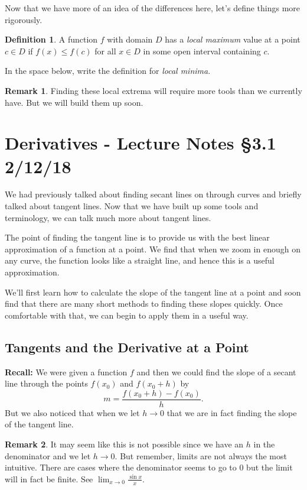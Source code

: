\documentclass[leqno]{article}
\theoremstyle{definition}
\newtheorem{definition}{Definition}[section]
\newtheorem{remark}{Remark}[section]
\theoremstyle{remark}
\theoremstyle{theorem}
\begin{document}
Now that we have more of an idea of the differences here, let's define things more rigorously.

\begin{definition}
A function $f$ with domain $D$ has a \emph{local maximum} value at a point $c\in D$ if $f(x)\leq f(c)$ for all $x\in D$ in some open interval containing $c$.

In the space below, write the definition for \emph{local minima}.
\vspace*{3cm}
\end{definition}

\begin{remark}
Finding these local extrema will require more tools than we currently have. But we will build them up soon.
\end{remark}

\section{Derivatives - Lecture Notes \S 3.1 2/12/18}

We had previously talked about finding secant lines on through curves and briefly talked about tangent lines.  Now that we have built up some tools and terminology, we can talk much more about tangent lines.  

The point of finding the tangent line is to provide us with the best linear approximation of a function at a point.  We find that when we zoom in enough on any curve, the function looks like a straight line, and hence this is a useful approximation.  

We'll first learn how to calculate the slope of the tangent line at a point and soon find that there are many short methods to finding these slopes quickly.  Once comfortable with that, we can begin to apply them in a useful way.

\subsection{Tangents and the Derivative at a Point}

\textbf{Recall:} We were given a function $f$ and then we could find the slope of a secant line through the points $f(x_0)$ and $f(x_0+h)$ by 
\[
m=\frac{f(x_0+h)-f(x_0)}{h}.
\]
But we also noticed that when we let $h\to 0$ that we are in fact finding the slope of the tangent line.  

\begin{remark}
It may seem like this is not possible since we have an $h$ in the denominator and we let $h\to 0$.  But remember, limits are not always the most intuitive.  There are cases where the denominator seems to go to $0$ but the limit will in fact be finite.  See $\lim_{x\to 0} \frac{\sin x}{x}$.
\end{remark}
\end{document}
